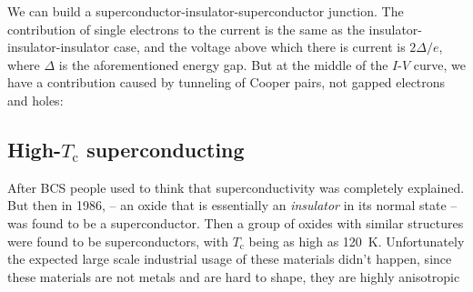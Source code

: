 \documentclass[hyperref, a4paper]{article}
\begin{document}
We can build a superconductor-insulator-superconductor junction.
The contribution of single electrons to the current 
is the same as the insulator-insulator-insulator case, 
and the voltage above which there is current is $2 \Delta / e$,
where $\Delta$ is the aforementioned energy gap.
But at the middle of the $I$-$V$ curve, 
we have a contribution caused by tunneling of Cooper pairs, 
not gapped electrons and holes: 

\subsection{High-$T_{\text{c}}$ superconducting} 

After BCS people used to think that superconductivity was completely explained.
But then in 1986,  -- 
an oxide that is essentially an \emph{insulator} in its normal state -- 
was found to be a superconductor.
Then a group of oxides with similar structures were found to be superconductors,
with $T_{\text{c}}$ being as high as \SI{120}{K}.
Unfortunately the expected large scale industrial usage of these materials didn't happen,
since these materials are not metals and are hard to shape, 
they are highly anisotropic 
\end{document}
